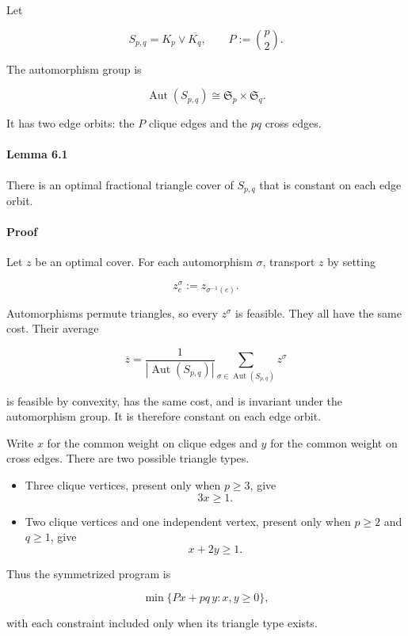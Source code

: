 \documentclass[
  american,
  11pt,
  a4paper,
]{article}
\providecommand{\tightlist}{%
  \setlength{\itemsep}{0pt}\setlength{\parskip}{0pt}}
\begin{document}
Let

\[
S_{p,q}=K_p\vee\overline{K_q},
\qquad
P:=\binom p2.
\]

The automorphism group is

\[
\operatorname{Aut}(S_{p,q})
\cong
\mathfrak S_p\times\mathfrak S_q.
\]

It has two edge orbits: the \(P\) clique edges and the \(pq\) cross edges.

\paragraph{Lemma 6.1}\label{lemma-6.1}

There is an optimal fractional triangle cover of \(S_{p,q}\) that is constant on each edge orbit.

\paragraph{Proof}\label{proof-8}

Let \(z\) be an optimal cover. For each automorphism \(\sigma\), transport \(z\) by setting

\[
z^\sigma_e:=z_{\sigma^{-1}(e)}.
\]

Automorphisms permute triangles, so every \(z^\sigma\) is feasible. They all have the same cost. Their average

\[
\overline z
=
\frac{1}{|\operatorname{Aut}(S_{p,q})|}
\sum_{\sigma\in\operatorname{Aut}(S_{p,q})}z^\sigma
\]

is feasible by convexity, has the same cost, and is invariant under the automorphism group. It is therefore constant on each edge orbit.

Write \(x\) for the common weight on clique edges and \(y\) for the common weight on cross edges. There are two possible triangle types.

\begin{itemize}
\tightlist
\item
  Three clique vertices, present only when \(p\ge3\), give
  \[
  3x\ge1.
  \]
\item
  Two clique vertices and one independent vertex, present only when \(p\ge2\) and \(q\ge1\), give
  \[
  x+2y\ge1.
  \]
\end{itemize}

Thus the symmetrized program is

\[
\min\{Px+pq\,y:x,y\ge0\},
\]

with each constraint included only when its triangle type exists.
\end{document}

